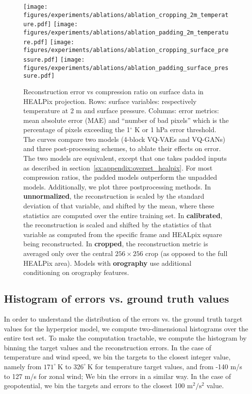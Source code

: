 \begin{figure}
    \centering
        \texttt{[image: figures/experiments/ablations/ablation\_cropping\_2m\_temperature.pdf]}
        \texttt{[image: figures/experiments/ablations/ablation\_padding\_2m\_temperature.pdf]}
        \texttt{[image: figures/experiments/ablations/ablation\_cropping\_surface\_pressure.pdf]}
        \texttt{[image: figures/experiments/ablations/ablation\_padding\_surface\_pressure.pdf]}
    \caption{Reconstruction error vs compression ratio on surface data in HEALPix projection. Rows: surface variables: respectively temperature at 2 m and surface pressure. Columns: error metrics: mean absolute error (MAE) and ``number of bad pixels'' which is the percentage of pixels exceeding the 1$^\circ$ K or 1 hPa error threshold. The curves compare two models (4-block VQ-VAEs and VQ-GANs) and three post-processing schemes, to ablate their effects on error. The two models are equivalent, except that one takes padded inputs as described in section~\ref{sx:appendix:overset_healpix}. For most compression ratios, the padded models outperform the unpadded models. Additionally, we plot three postprocessing methods. In \textbf{unnormalized}, the reconstruction is scaled by the standard deviation of that variable, and shifted by the mean, where these statistics are computed over the entire training set. In \textbf{calibrated}, the reconstruction is scaled and shifted by the statistics of that variable as computed from the specific frame and HEALpix square being reconstructed. In \textbf{cropped}, the reconstruction metric is averaged only over the central $256 \times 256$ crop (as opposed to the full HEALPix area). Models with \textbf{orography} use additional conditioning on orography features.}
\label{fig:ablate_pad_and_postprocess}
\end{figure}

\subsection{Histogram of errors vs. ground truth values}
\label{sx:appendix:hist2d-err-value}

In order to understand the distribution of the errors vs. the ground truth target values for the hyperprior model, we compute two-dimensional histograms over the entire test set. To make the computation tractable, we compute the histogram by binning the target values and the reconstruction errors. In the case of temperature and wind speed, we bin the targets to the closest integer value, namely from $171^\circ~\text{K}$ to $326^\circ~\text{K}$ for temperature target values, and from -140 m/s to 127 m/s for zonal wind; We bin the errors in a similar way. In the case of geopotential, we bin the targets and errors to the closest 100 $\text{m}^2/\text{s}^2$ value.

